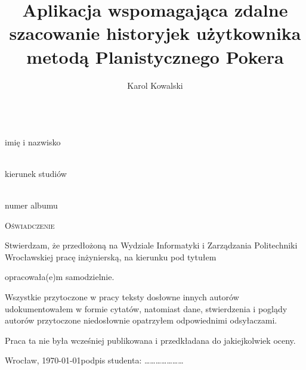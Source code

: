 \documentclass[12pt]{article}
\begin{document}
\maketitle

\noindent\author{Karol Kowalski}\\
imię i nazwisko

\noindent{}\\
kierunek studiów

\noindent{}\\
numer albumu

\vspace{1cm}
\begin{center}
\Large\textsc{Oświadczenie}
\end{center}

\vspace{1cm}

Stwierdzam, że przedłożoną na Wydziale Informatyki i Zarządzania Politechniki Wrocławskiej pracę inżynierską, na kierunku
pod tytułem
\title{Aplikacja wspomagająca zdalne szacowanie historyjek użytkownika metodą
Planistycznego Pokera}
opracowała(e)m samodzielnie. 
	
Wszystkie przytoczone w pracy teksty dosłowne innych autorów udokumentowałem w formie cytatów, natomiast dane, stwierdzenia i poglądy autorów przytoczone niedosłownie opatrzyłem odpowiednimi odsyłaczami.

Praca ta nie była wcześniej publikowana i przedkładana do jakiejkolwiek oceny.

\vspace{2cm}

\noindent Wrocław, \today \hfill podpis studenta: \dots\dots\dots\dots\dots\dots\dots
\end{document}
